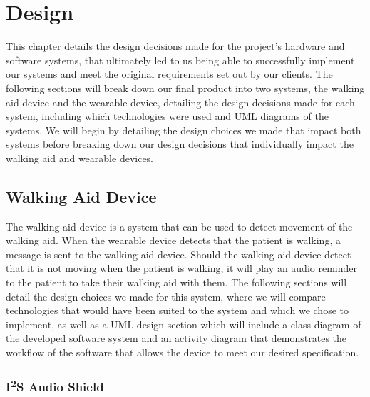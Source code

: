 \chapter{Design}
\label{ch:design}

    This chapter details the design decisions made for the project's hardware and software systems, that ultimately led to us being able to successfully implement our systems and meet the original requirements set out by our clients. The following sections will break down our final product into two systems, the walking aid device and the wearable device, detailing the design decisions made for each system, including which technologies were used and UML diagrams of the systems. We will begin by detailing the design choices we made that impact both systems before breaking down our design decisions that individually impact the walking aid and wearable devices.

    \section{Walking Aid Device}
    \label{sec:walking_aid}

        The walking aid device is a system that can be used to detect movement of the walking aid. When the wearable device detects that the patient is walking, a message is sent to the walking aid device. Should the walking aid device detect that it is not moving when the patient is walking, it will play an audio reminder to the patient to take their walking aid with them. The following sections will detail the design choices we made for this system, where we will compare technologies that would have been suited to the system and which we chose to implement, as well as a UML design section which will include a class diagram of the developed software system and an activity diagram that demonstrates the workflow of the software that allows the device to meet our desired specification.

        \subsection{I\textsuperscript{2}S Audio Shield}
        \label{subsec:i2s_audio_shield}

